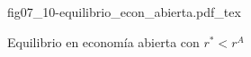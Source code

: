 \begin{figure}[h]
\centering
\def\svgwidth{0.75\textwidth}
{fig07_10-equilibrio_econ_abierta.pdf_tex}
\caption{Equilibrio en economía abierta con $r^*<r^A$}
\label{fig07_10-equilibrio_econ_abierta}
\end{figure}
